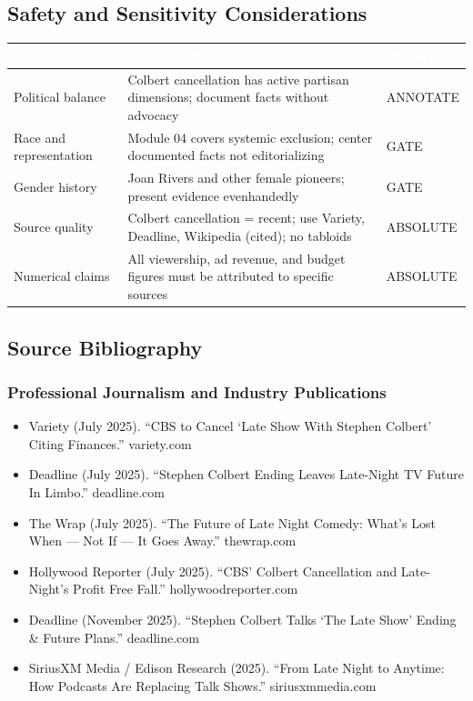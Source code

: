\documentclass[11pt,letterpaper]{article}
\newcommand{\tableheader}[1]{\textbf{\sffamily\textcolor{white}{#1}}}
\begin{document}
\subsection{Safety and Sensitivity Considerations}

\begin{center}
\begin{tabularx}{\textwidth}{L{3cm}XC{2.5cm}}
\toprule
{}
\tableheader{Area} & \tableheader{Consideration} & \tableheader{Protocol} \\
\midrule
Political balance & Colbert cancellation has active partisan dimensions; document facts without advocacy & ANNOTATE \\
Race and representation & Module 04 covers systemic exclusion; center documented facts not editorializing & GATE \\
Gender history & Joan Rivers and other female pioneers; present evidence evenhandedly & GATE \\
Source quality & Colbert cancellation = recent; use Variety, Deadline, Wikipedia (cited); no tabloids & ABSOLUTE \\
Numerical claims & All viewership, ad revenue, and budget figures must be attributed to specific sources & ABSOLUTE \\
\bottomrule
\end{tabularx}
\end{center}

\subsection{Source Bibliography}

\subsubsection{Professional Journalism and Industry Publications}
\begin{itemize}[leftmargin=1.5em, itemsep=0.2em]
  \item Variety (July 2025). ``CBS to Cancel `Late Show With Stephen Colbert' Citing Finances.'' variety.com
  \item Deadline (July 2025). ``Stephen Colbert Ending Leaves Late-Night TV Future In Limbo.'' deadline.com
  \item The Wrap (July 2025). ``The Future of Late Night Comedy: What's Lost When --- Not If --- It Goes Away.'' thewrap.com
  \item Hollywood Reporter (July 2025). ``CBS' Colbert Cancellation and Late-Night's Profit Free Fall.'' hollywoodreporter.com
  \item Deadline (November 2025). ``Stephen Colbert Talks `The Late Show' Ending \& Future Plans.'' deadline.com
  \item SiriusXM Media / Edison Research (2025). ``From Late Night to Anytime: How Podcasts Are Replacing Talk Shows.'' siriusxmmedia.com
\end{itemize}
\end{document}

